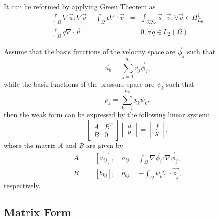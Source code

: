 \documentclass[a4paper]{article}
\begin{document}
It can be reformed by applying Green Theorem as
\begin{equation}
\begin{array}{rcl}
\int_\Omega \nabla \vec{u} : \nabla \vec{v} - \int_\Omega p\nabla
\cdot \vec{v} &=& \int_{\partial \Omega_N}\vec{s}\cdot \vec{v}, 
\forall \vec{v} \in H^1_{E_0}\\ \int_\Omega q\nabla \cdot \vec{u}
&=& 0, \forall q \in L_2(\Omega)
\label{eq::Stokes}
\end{array}
\end{equation}

Assume that the basis functions of the velocity space are
{$\vec{\phi}_j$} such that
\begin{equation}
\vec{u}_h = \sum^{n_u}_{j=1}u_j\vec{\phi}_j,
\label{eq::Stokes-u}
\end{equation}
while the basis functions of the pressure space are $\psi_k$ such that
\begin{equation}
p_h = \sum^{n_p}_{k=1}p_k\psi_k,
\label{eq::Stokes-p}
\end{equation}
then the weak form can be expressed by the following linear system:
\begin{equation}
\left[ \begin{array}{ccc}
A & B^T \\
B & 0
\end{array}
\right]
\left[\begin{array}{ccc}
u\\
p
\end{array}
\right]=
\left[\begin{array}{ccc}
f\\
g
\end{array}
\right],
\label{mt::Stokes}
\end{equation}
where the matrix $A$ and $B$ are given by
\begin{equation}
\begin{array}{rcl}
A &=& [a_{ij}], \quad a_{ij} = \int_{\Omega} \nabla \vec{\phi}_i :
\nabla \vec{\phi}_j,\\ B &=& [b_{kj}], \quad b_{kj} = -\int_{\Omega}
\psi_k\nabla \cdot \vec{\phi_j},
\end{array}
\end{equation}
respectively.


\subsection{Matrix Form}
\end{document}
